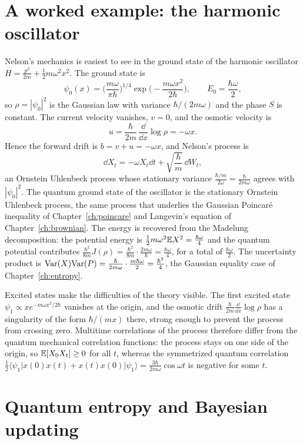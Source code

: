 \section{A worked example: the harmonic oscillator}

Nelson's mechanics is easiest to see in the ground state of the harmonic oscillator $H = \frac{p^2}{2m}+\frac12m\omega^2x^2$. The ground state is
\[
\psi_0(x) = \Big(\frac{m\omega}{\pi\hbar}\Big)^{1/4}\exp\Big(-\frac{m\omega x^2}{2\hbar}\Big),\qquad E_0 = \frac{\hbar\omega}{2},
\]
so $\rho = |\psi_0|^2$ is the Gaussian law with variance $\hbar/(2m\omega)$ and the phase $S$ is constant. The current velocity vanishes, $v = 0$, and the osmotic velocity is
\[
u = \frac{\hbar}{2m}\,\frac{\dd}{\dd x}\log\rho = -\omega x.
\]
Hence the forward drift is $b = v+u = -\omega x$, and Nelson's process is
\[
\dd X_t = -\omega X_t\dd t+\sqrt{\frac\hbar m}\,\dd W_t,
\]
an Ornstein Uhlenbeck process whose stationary variance $\frac{\hbar/m}{2\omega} = \frac{\hbar}{2m\omega}$ agrees with $|\psi_0|^2$. The quantum ground state of the oscillator is the stationary Ornstein Uhlenbeck process, the same process that underlies the Gaussian Poincar\'e inequality of Chapter~\ref{ch:poincare} and Langevin's equation of Chapter~\ref{ch:brownian}. The energy is recovered from the Madelung decomposition: the potential energy is $\frac12m\omega^2\mathbb{E} X^2 = \frac{\hbar\omega}{4}$ and the quantum potential contributes $\frac{\hbar^2}{8m}J(\rho) = \frac{\hbar^2}{8m}\cdot\frac{2m\omega}{\hbar} = \frac{\hbar\omega}{4}$, for a total of $\frac{\hbar\omega}2$. The uncertainty product is $\mathrm{Var}(X)\mathrm{Var}(P) = \frac{\hbar}{2m\omega}\cdot\frac{m\hbar\omega}{2} = \frac{\hbar^2}{4}$, the Gaussian equality case of Chapter~\ref{ch:entropy}.

Excited states make the difficulties of the theory visible. The first excited state $\psi_1\propto xe^{-m\omega x^2/2\hbar}$ vanishes at the origin, and the osmotic drift $\frac{\hbar}{2m}\frac{\dd}{\dd x}\log\rho$ has a singularity of the form $\hbar/(mx)$ there, strong enough to prevent the process from crossing zero. Multitime correlations of the process therefore differ from the quantum mechanical correlation functions: the process stays on one side of the origin, so $\mathbb{E}[X_0X_t]\geq0$ for all $t$, whereas the symmetrized quantum correlation $\frac12\langle\psi_1|x(0)x(t)+x(t)x(0)|\psi_1\rangle = \frac{3\hbar}{2m\omega}\cos\omega t$ is negative for some $t$.

\section{Quantum entropy and Bayesian updating}

